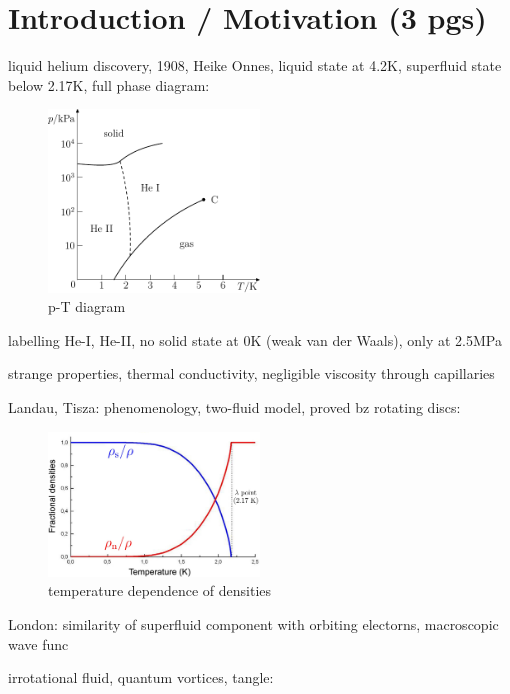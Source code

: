 \chapter*{Introduction / Motivation (3 pgs)}

	liquid helium discovery, 1908, Heike Onnes, liquid state at 4.2K, superfluid state below 2.17K, full phase diagram:

	\begin{figure}[h]
		\centering
		\includegraphics[width=0.5\textwidth]{graphics/theory/phase_diag}
		\caption{p-T diagram}
		\label{phase}
	\end{figure}

	labelling He-I, He-II, no solid state at 0K (weak van der Waals), only at 2.5MPa

	strange properties, thermal conductivity, negligible viscosity through capillaries

	Landau, Tisza: phenomenology, two-fluid model, proved bz rotating discs:

	\begin{figure}[h]
		\centering
		\includegraphics[width=0.5\textwidth]{graphics/theory/densities}
		\caption{temperature dependence of densities}
		\label{densities}
	\end{figure}

	London: similarity of superfluid component with orbiting electorns, macroscopic wave func

	irrotational fluid, quantum vortices, tangle:

